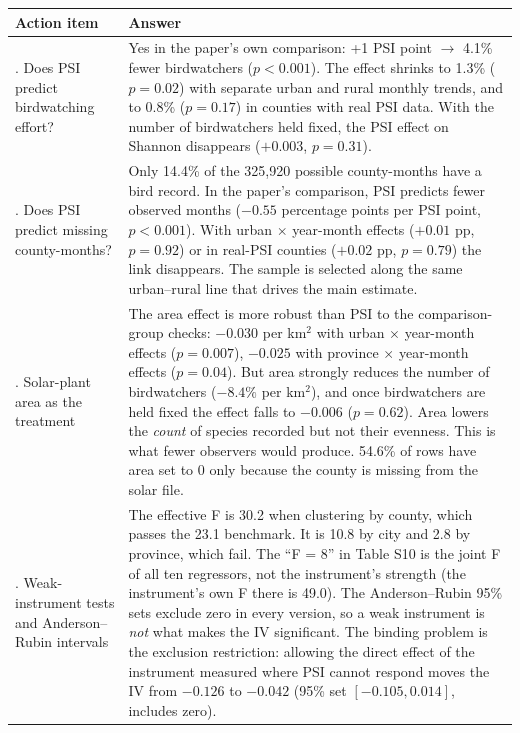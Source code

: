 \documentclass[11pt]{article}
\begin{document}
\begin{center}
\small
\begin{tabularx}{\linewidth}{>{\raggedright\arraybackslash}p{3.6cm} >{\raggedright\arraybackslash}X}
\toprule
\textbf{Action item} & \textbf{Answer} \\
\midrule
1. Does PSI predict birdwatching effort? &
Yes in the paper's own comparison: +1 PSI point $\rightarrow$ 4.1\% fewer birdwatchers ($p<0.001$). The effect shrinks to 1.3\% ($p=0.02$) with separate urban and rural monthly trends, and to 0.8\% ($p=0.17$) in counties with real PSI data. With the number of birdwatchers held fixed, the PSI effect on Shannon disappears ($+0.003$, $p=0.31$). \\
\addlinespace
2. Does PSI predict missing county-months? &
Only 14.4\% of the 325,920 possible county-months have a bird record. In the paper's comparison, PSI predicts fewer observed months ($-0.55$ percentage points per PSI point, $p<0.001$). With urban $\times$ year-month effects ($+0.01$ pp, $p=0.92$) or in real-PSI counties ($+0.02$ pp, $p=0.79$) the link disappears. The sample is selected along the same urban--rural line that drives the main estimate. \\
\addlinespace
3. Solar-plant area as the treatment &
The area effect is more robust than PSI to the comparison-group checks: $-0.030$ per km$^2$ with urban $\times$ year-month effects ($p=0.007$), $-0.025$ with province $\times$ year-month effects ($p=0.04$). But area strongly reduces the number of birdwatchers ($-8.4\%$ per km$^2$), and once birdwatchers are held fixed the effect falls to $-0.006$ ($p=0.62$). Area lowers the \emph{count} of species recorded but not their evenness. This is what fewer observers would produce. 54.6\% of rows have area set to 0 only because the county is missing from the solar file. \\
\addlinespace
4. Weak-instrument tests and Anderson--Rubin intervals &
The effective F is 30.2 when clustering by county, which passes the 23.1 benchmark. It is 10.8 by city and 2.8 by province, which fail. The ``F = 8'' in Table S10 is the joint F of all ten regressors, not the instrument's strength (the instrument's own F there is 49.0). The Anderson--Rubin 95\% sets exclude zero in every version, so a weak instrument is \emph{not} what makes the IV significant. The binding problem is the exclusion restriction: allowing the direct effect of the instrument measured where PSI cannot respond moves the IV from $-0.126$ to $-0.042$ (95\% set $[-0.105, 0.014]$, includes zero). \\

\end{tabularx}
\end{center}
\end{document}
